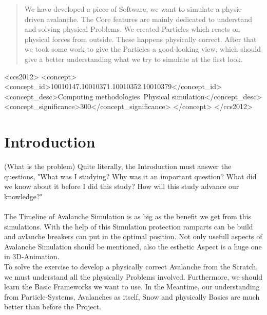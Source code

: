 \documentclass{sig-alternate-05-2015}
\begin{document}
\begin{abstract}
We have developed a piece of Software, we want to simulate a physic driven avalanche. The Core features are mainly dedicated to understand and solving physical Problems. We created Particles which reacts on physical forces from outside. These happens physically correct. After that we took some work to give the Particles a good-looking view, which should give a better understanding what we try to simulate at the first look. \\

\end{abstract}


\begin{CCSXML}
<ccs2012>
<concept>
<concept_id>10010147.10010371.10010352.10010379</concept_id>
<concept_desc>Computing methodologies~Physical simulation</concept_desc>
<concept_significance>300</concept_significance>
</concept>
</ccs2012>
\end{CCSXML}





\section{Introduction}
(What is the problem)
Quite literally, the Introduction must answer the questions, "What was I studying? Why was it an important question? What did we know about it before I did this study? How will this study advance our knowledge?"
\\
\\
The Timeline of Avalanche Simulation is as big as the benefit we get from this simulations. With the help of this Simulation protection ramparts can be build and avlanche breakers can put in the optimal position. Not only usefull aspects of Avalanche Simulation should be mentioned, also the esthetic Aspect is a huge one in 3D-Animation. 
\\
To solve the exercise to develop a physically correct Avalanche from the Scratch, we must understand all the physically Problems involved. Furthermore, we should learn the Basic Frameworks we want to use. 
In the Meantime, our understanding from Particle-Systems, Avalanches as itself, Snow and physically Basics are much better than before the Project.
\\
\end{document}

